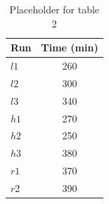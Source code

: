 \documentclass[jgrga, draft]{agutex}
\begin{document}
\begin{table}
\caption{Placeholder for table 2}
\centering
\label{table:heat_fluxes}
\begin{tabular}{l c}
\hline
Run  & Time (min)  \\
\hline
 $l1$  & 260   \\
 $l2$  & 300   \\
 $l3$  & 340   \\
 $h1$  & 270   \\
 $h2$  & 250   \\
 $h3$  & 380   \\
 $r1$  & 370   \\
 $r2$  & 390   \\
\hline
\end{tabular}
\label{table:2}
\end{table}
\end{document}
